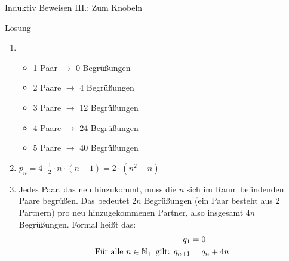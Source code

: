 \begin{frame}{Induktiv Beweisen III.: Zum Knobeln}
	\begin{block}{Lösung}
		\begin{enumerate}
			\item \begin{itemize}
				\item 1 Paar $\rightarrow$ 0 Begrüßungen
				\item 2 Paare $\rightarrow$ 4 Begrüßungen
				\item 3 Paare $\rightarrow$ 12 Begrüßungen
				\item 4 Paare $\rightarrow$ 24 Begrüßungen
				\item 5 Paare $\rightarrow$ 40 Begrüßungen
			\end{itemize} \pause
			\item $p_n = 4 \cdot \frac{1}{2} \cdot n \cdot (n-1) = 2 \cdot (n^2 -n)$ \pause
			\item Jedes Paar, das neu hinzukommt, muss die $n$ sich im Raum befindenden Paare begrüßen. Das bedeutet $2n$ Begrüßungen (ein Paar besteht aus $2$ Partnern) pro neu hinzugekommenen Partner, also insgesamt $4n$ Begrüßungen. Formal heißt das: 
			\begin{align*}
				q_1 &= 0 \\
				\text{Für alle } n \in \mathbb{N}_+ \text{ gilt: } q_{n+1} &= q_n + 4n
			\end{align*}
			\setcounter{kevin}{\value{enumi}}
		\end{enumerate}
	\end{block}
\end{frame}

